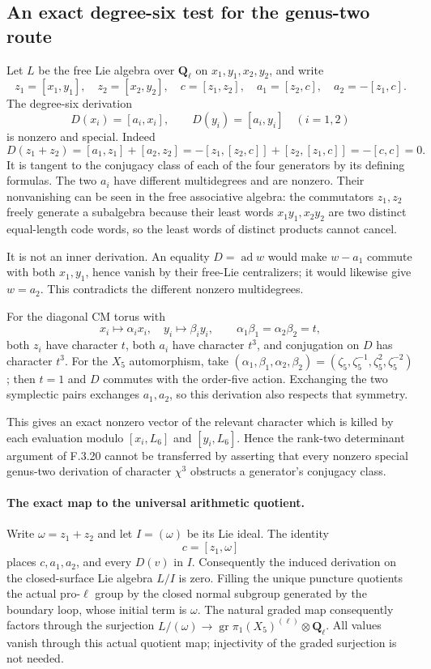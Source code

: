 \subsection*{An exact degree-six test for the genus-two route}

Let $L$ be the free Lie algebra over $\mathbf Q_\ell$ on
$x_1,y_1,x_2,y_2$, and write
\[
 z_1=[x_1,y_1],\quad z_2=[x_2,y_2],\quad
 c=[z_1,z_2],\quad a_1=[z_2,c],\quad a_2=-[z_1,c].
\]
The degree-six derivation
\[
 D(x_i)=[a_i,x_i],\qquad D(y_i)=[a_i,y_i]\quad(i=1,2)
\]
is nonzero and special. Indeed
\[
 D(z_1+z_2)=[a_1,z_1]+[a_2,z_2]
 =-[z_1,[z_2,c]]+[z_2,[z_1,c]]=-[c,c]=0.
\]
It is tangent to the conjugacy class of each of the four
generators by its defining formulas. The two $a_i$ have
different multidegrees and are nonzero. Their nonvanishing
can be seen in the free associative algebra: the commutators
$z_1,z_2$ freely generate a subalgebra because their least
words $x_1y_1,x_2y_2$ are two distinct equal-length code words,
so the least words of distinct products cannot cancel.

It is not an inner derivation. An equality $D=\operatorname{ad}w$
would make $w-a_1$ commute with both $x_1,y_1$, hence vanish
by their free-Lie centralizers; it would likewise give
$w=a_2$. This contradicts the different nonzero multidegrees.

For the diagonal CM torus with
\[
 x_i\mapsto\alpha_i x_i,\quad y_i\mapsto\beta_i y_i,
 \qquad \alpha_1\beta_1=\alpha_2\beta_2=t,
\]
both $z_i$ have character $t$, both $a_i$ have character
$t^3$, and conjugation on $D$ has character $t^3$.
For the $X_5$ automorphism, take
$(\alpha_1,\beta_1,\alpha_2,\beta_2)
=(\zeta_5,\zeta_5^{-1},\zeta_5^2,\zeta_5^{-2})$;
then $t=1$ and $D$ commutes with the order-five action.
Exchanging the two symplectic pairs exchanges $a_1,a_2$,
so this derivation also respects that symmetry.

This gives an exact nonzero vector of the relevant character
which is killed by each evaluation modulo $[x_i,L_6]$ and
$[y_i,L_6]$. Hence the rank-two determinant argument of
F.3.20 cannot be transferred by asserting that every
nonzero special genus-two derivation of character $\chi^3$
obstructs a generator's conjugacy class.

\paragraph{The exact map to the universal arithmetic quotient.}
Write $\omega=z_1+z_2$ and let $I=(\omega)$ be its Lie ideal.
The identity
\[
 c=[z_1,\omega]
\]
places $c,a_1,a_2$, and every $D(v)$ in $I$. Consequently the
induced derivation on the closed-surface Lie algebra $L/I$ is
zero. Filling the unique puncture quotients the actual
pro-$\ell$ group by the closed normal subgroup generated by
the boundary loop, whose initial term is $\omega$.
The natural graded map consequently factors through the
surjection $L/(\omega)\to\operatorname{gr}\pi_1(X_5)^{(\ell)}
\otimes\mathbf Q_\ell$. All values vanish through this
actual quotient map; injectivity of the graded surjection is
not needed.

